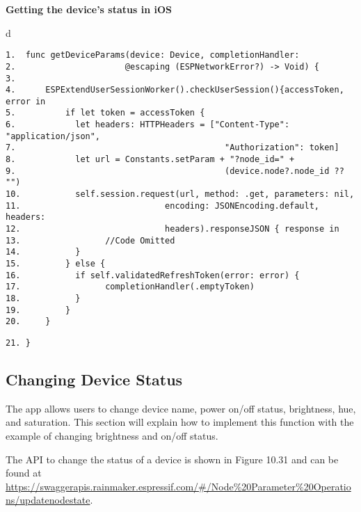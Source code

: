 \documentclass[a4paper,12pt]{book}
\begin{document}
\vspace{6pt}
\textbf{Getting the device’s status in iOS}


\begin{codebloc}
\begin{tabular}{d}
\vspace{2pt}
\begin{verbatim}
1.  func getDeviceParams(device: Device, completionHandler:
2.                      @escaping (ESPNetworkError?) -> Void) {
3.
4.      ESPExtendUserSessionWorker().checkUserSession(){accessToken, error in
5.          if let token = accessToken {
6.            let headers: HTTPHeaders = ["Content-Type": "application/json",
7.                                          "Authorization": token]
8.            let url = Constants.setParam + "?node_id=" +
9.                                          (device.node?.node_id ?? "")
10.           self.session.request(url, method: .get, parameters: nil,
11.                             encoding: JSONEncoding.default, headers:
12.                             headers).responseJSON { response in
13.                 //Code Omitted
14.           }
15.         } else {
16.           if self.validatedRefreshToken(error: error) {
17.                 completionHandler(.emptyToken)
18.           }
19.         }
20.     }
\end{verbatim}
\verb|21. }|
\end{tabular}
\end{codebloc}

\subsection{Changing Device Status}
The app allows users to change device name, power on/off status, brightness, hue, and saturation. This section will explain how to implement this function with the example of changing brightness and on/off status.

The API to change the status of a device is shown in Figure 10.31 and can be found at \href{https://swaggerapis.rainmaker.espressif.com/#/Node%20Parameter%20Operations/updatenodestate}{https://swaggerapis.rainmaker.espressif.com/\#/Node\%20Parameter\%20Operations/\newline updatenodestate}.
\end{document}
